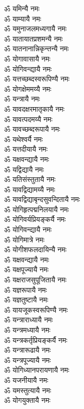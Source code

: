 \begin{flushleft}
\begin{multicols}{2}
ॐ यमिन्यै नमः\\
ॐ याम्यायै नमः\hfill{}\\
ॐ यमुनाजलमध्यगायै नमः\\
ॐ यातायातप्रशमन्यै नमः\\
ॐ यातनानान्निकृन्तन्यै नमः\\
ॐ योगावासायै नमः\\
ॐ योगिवन्द्यायै नमः\\
ॐ यत्तच्छब्दस्वरूपिण्यै नमः\\
ॐ योगक्षेममय्यै नमः\\
ॐ यन्त्रायै नमः\\
ॐ यावदक्षरमातृकायै नमः\\
ॐ यावत्पदमय्यै नमः\hfill{}\\
ॐ यावच्छब्दरूपायै नमः\\
ॐ यथेश्वर्यै नमः\\
ॐ यत्तदीयायै नमः\\
ॐ यक्षवन्द्यायै नमः\\
ॐ यद्विद्यायै नमः\\
ॐ यतिसंस्तुतायै नमः\\
ॐ यावद्विद्यामय्यै नमः\\
ॐ यावद्विद्याबृन्दसुवन्दितायै नमः\\
ॐ योगिहृत्पद्मनिलयायै नमः\\
ॐ योगिवर्यप्रियङ्कर्यै नमः\hfill{}\\
ॐ योगिवन्द्यायै नमः\\
ॐ योगिमात्रे नमः\\
ॐ योगीशफलदायिन्यै नमः\\
ॐ यक्षवन्द्यायै नमः\\
ॐ यक्षपूज्यायै नमः\\
ॐ यक्षराजसुपूजितायै नमः\\
ॐ यज्ञरूपायै नमः\\
ॐ यज्ञतुष्टायै नमः\\
ॐ यायजूकस्वरूपिण्यै नमः\\
ॐ यन्त्राराध्यायै नमः\hfill{}\\
ॐ यन्त्रमध्यायै नमः\\
ॐ यन्त्रकर्तृप्रियङ्कर्यै नमः\\
ॐ यन्त्रारूढायै नमः\\
ॐ यन्त्रपूज्यायै नमः\\
ॐ योगिध्यानपरायणायै नमः\\
ॐ यजनीयायै नमः\\
ॐ यमस्तुत्यायै नमः\\
ॐ योगयुक्तायै नमः\\

\end{multicols}
\end{flushleft}
